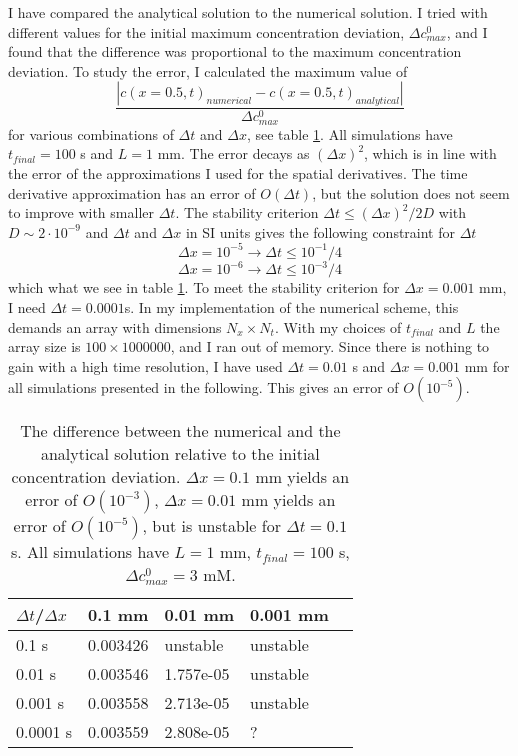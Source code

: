 \documentclass{article}
\begin{document}
I have compared the analytical solution to the numerical solution. I tried with different values for the initial maximum concentration deviation, $\Delta c^0_{max}$, and I found that the difference was proportional to the maximum concentration deviation. To study the error, I calculated the maximum value of
\begin{equation}
\frac{|c(x=0.5,t)_{numerical}-c(x=0.5,t)_{analytical}|}{\Delta c^0_{max}}
\end{equation}
for various combinations of $\Delta t$ and $\Delta x$, see table \ref{tab:error}. All simulations have $t_{final} = 100$ s and $L=1$ mm. The error decays as $(\Delta x)^2$, which is in line with the error of the  approximations I used for the spatial derivatives. The time derivative approximation has an error of $O(\Delta t)$, but the solution does not seem to improve with smaller $\Delta t$. The stability criterion $\Delta t \leq (\Delta x)^2/2D$ with $D \sim 2\cdot 10^{-9}$ and $\Delta t $ and $\Delta x$ in SI units gives the following constraint for $\Delta t$
$$\Delta x= 10^{-5} \rightarrow \Delta t \leq 10^{-1}/4$$
$$\Delta x= 10^{-6} \rightarrow \Delta t \leq 10^{-3}/4$$ 
which what we see in table \ref{tab:error}. To meet the stability criterion for $\Delta x = 0.001$ mm, I need $\Delta t = 0.0001$s. In my implementation of the numerical scheme, this demands an array with dimensions $N_x \times N_t$. With my choices of $t_{final}$ and $L$ the array size is  $100\times 1000 000$, and I ran out of memory.
Since there is nothing to gain with a high time resolution, I have used $\Delta t = 0.01$ s and $\Delta x = 0.001$ mm for all simulations presented in the following. This gives an error of $O(10^{-5})$. 
\begin{table}[h!]
  \centering
  \caption{The difference between the numerical and the analytical solution relative to the initial concentration deviation. $\Delta x =0.1$ mm yields an error of $O(10^{-3})$, $\Delta x =0.01$ mm yields an error of $O(10^{-5})$, but is unstable for $\Delta t = 0.1$ s. All simulations have $L=1$ mm, $t_ {final} =100$ s, $\Delta c^0_{max} =3$ mM.}
  \label{tab:error}
  \begin{tabular}{l||l|l|l|l}
$\Delta t$/$\Delta x$ & 0.1 mm & 0.01 mm & 0.001 mm  \\
\hline
0.1 s & 0.003426 &  unstable & unstable \\
0.01 s & 0.003546 & 1.757e-05  & unstable \\
0.001 s & 0.003558 & 2.713e-05 & unstable \\
0.0001 s & 0.003559& 2.808e-05 & ? \\

 \end{tabular}
\end{table}
\end{document}
